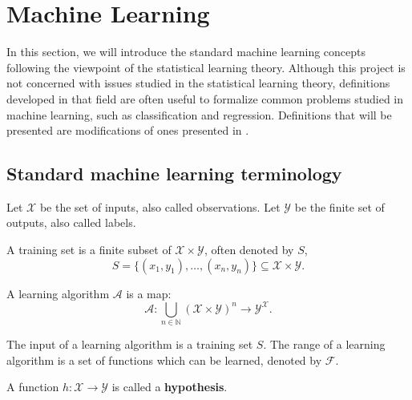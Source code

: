 \section{Machine Learning}
\label{section:introduction:machine-learning}
In this section, we will introduce the standard machine learning concepts following the viewpoint of the statistical learning theory. Although this project is not concerned with issues studied in the statistical learning theory, definitions developed in that field are often useful to formalize common problems studied in machine learning, such as classification and regression. Definitions that will be presented are modifications of ones presented in \cite{shalevshwartz_2014_understanding}.

\subsection{Standard machine learning terminology}
\label{subsection:ml:terminology}
Let $\mathcal{X}$ be the set of inputs, also called observations.
Let $\mathcal{Y}$ be the finite set of outputs, also called labels.

\begin{definition}
A training set is a finite subset of $ \mathcal{X} \times \mathcal{Y}$, often denoted by $S$,
\begin{equation*}
    S = \{ (x_1, y_1), \ldots, (x_n, y_n) \} \subseteq \mathcal{X} \times \mathcal{Y}.
\end{equation*}
\end{definition}

\begin{definition}
A learning algorithm $\mathcal{A}$ is a map: 
\begin{equation*}
    \mathcal{A} : \bigcup_{n \in \mathbb{N}} (\mathcal{X} \times \mathcal{Y})^n \to \mathcal{Y}^\mathcal{X}.
\end{equation*}
\end{definition}

\begin{remark}
The input of a learning algorithm is a training set $S$. The range of a learning algorithm is a set of functions which can be learned, denoted by $\mathcal{F}$. 
\end{remark}

\begin{definition}[a hypothesis]
A function $h : \mathcal{X} \to \mathcal{Y}$ is called a \textbf{hypothesis}.
\end{definition}

